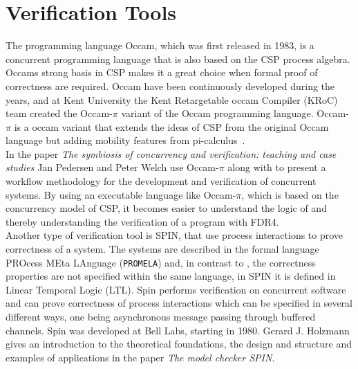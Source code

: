 \section{Verification Tools}
The programming language Occam\cite{Occam1995}, which was first released in 1983, is a concurrent programming language that is also based on the CSP process algebra. Occams strong basis in CSP makes it a great choice when formal proof of correctness are required.
Occam have been continuously developed during the years, and at Kent University the Kent Retargetable occam Compiler (KRoC) team created the Occam-$\pi$\cite{UniveristyofKent} variant of the Occam programming language.
Occam-$\pi$ is a occam variant that extends the ideas of CSP from the original Occam language but adding mobility features from pi-calculus~\cite{Milner1992}.
\\
In the paper \textit{The symbiosis of concurrency and verification: teaching and case studies}\cite{Pedersen2018} Jan Pedersen and Peter Welch use Occam-$\pi$ along with \cspm{} to present a workflow methodology for the development and verification of concurrent systems. By using an executable language like Occam-$\pi$, which is based on the concurrency model of CSP, it becomes easier to understand the logic of \cspm{} and thereby understanding the verification of a program with FDR4.\\

Another type of verification tool is SPIN\cite{spin}, that use process interactions to prove correctness of a system. The systems are described in the formal language PROcess MEta LAnguage (\texttt{PROMELA})\cite{Holzmann1991} and, in contrast to \cspm, the correctness properties are not specified within the same language, in SPIN it is defined in Linear Temporal Logic (LTL)\cite{Pnueli1977}.
Spin performs verification on concurrent software and can prove correctness of process interactions which can be specified in several different ways, one being asynchronous message passing through buffered channels.
Spin was developed at Bell Labs, starting in 1980. Gerard J. Holzmann gives an introduction to the theoretical foundations, the design and structure and examples of applications in the paper \textit{The model checker SPIN}\cite{Holzmann1997}.\\

